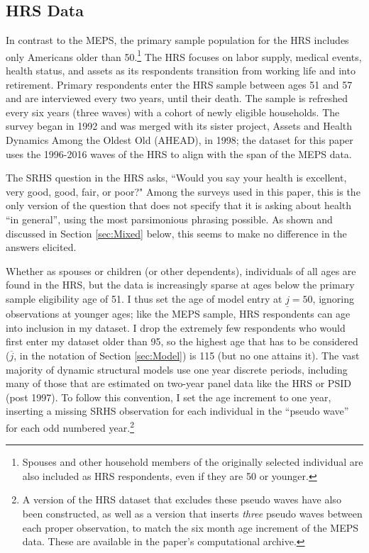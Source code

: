 \documentclass[12pt,pdftex,letterpaper]{article}
\newcommand{\Age}{j}
\newcommand{\AgeMin}{\underline{\Age}}
\newcommand{\AgeMax}{\overline{\Age}}
\begin{document}
\subsection{HRS Data}\label{sec:HRS}

In contrast to the MEPS, the primary sample population for the HRS includes only Americans older than 50.\footnote{Spouses and other household members of the originally selected individual are also included as HRS respondents, even if they are 50 or younger.}  The HRS focuses on labor supply, medical events, health status, and assets as its respondents transition from working life and into retirement.  Primary respondents enter the HRS sample between ages 51 and 57 and are interviewed every two years, until their death.  The sample is refreshed every six years (three waves) with a cohort of newly eligible households.  The survey began in 1992 and was merged with its sister project, Assets and Health Dynamics Among the Oldest Old (AHEAD), in 1998; the dataset for this paper uses the 1996-2016 waves of the HRS to align with the span of the MEPS data.

The SRHS question in the HRS asks, ``Would you say your health is excellent, very good, good, fair, or poor?"  Among the surveys used in this paper, this is the only version of the question that does not specify that it is asking about health ``in general'', using the most parsimonious phrasing possible.  As shown and discussed in Section \ref{sec:Mixed} below, this seems to make no difference in the answers elicited.

Whether as spouses or children (or other dependents), individuals of all ages are found in the HRS, but the data is increasingly sparse at ages below the primary sample eligibility age of 51.  I thus set the age of model entry at $\AgeMin=50$, ignoring observations at younger ages; like the MEPS sample, HRS respondents can age into inclusion in my dataset.  I drop the extremely few respondents who would first enter my dataset older than 95, so the highest age that has to be considered ($\AgeMax$, in the notation of Section \ref{sec:Model}) is 115 (but no one attains it).  The vast majority of dynamic structural models use one year discrete periods, including many of those that are estimated on two-year panel data like the HRS or PSID (post 1997).  To follow this convention, I set the age increment to one year, inserting a missing SRHS observation for each individual in the ``pseudo wave'' for each odd numbered year.\footnote{A version of the HRS dataset that excludes these pseudo waves have also been constructed, as well as a version that inserts \textit{three} pseudo waves between each proper observation, to match the six month age increment of the MEPS data.  These are available in the paper's computational archive.}
\end{document}
